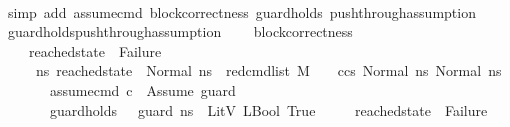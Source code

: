 \begin{isabellebody}
%
\isadelimproof
\ \ \ \ %
\endisadelimproof
%
\isatagproof
{}\isamarkupfalse%
\ {\isacharparenleft}{\kern0pt}simp\ add{\isacharcolon}{\kern0pt}\ assume{\isacharunderscore}{\kern0pt}cmd\ block{\isacharunderscore}{\kern0pt}correctness\ guard{\isacharunderscore}{\kern0pt}holds\ push{\isacharunderscore}{\kern0pt}through{\isacharunderscore}{\kern0pt}assumption{}{\isacharparenright}{\kern0pt}%
\endisatagproof
{\isafoldproof}%
%
\isadelimproof
\isanewline
%
\endisadelimproof
\isanewline
{}\isamarkupfalse%
\ guard{\isacharunderscore}{\kern0pt}holds{\isacharunderscore}{\kern0pt}push{\isacharunderscore}{\kern0pt}through{\isacharunderscore}{\kern0pt}assumption{}{\isacharcolon}{\kern0pt}\ \isanewline
\ \ \ block{\isacharunderscore}{\kern0pt}correctness{\isacharcolon}{\kern0pt}\ \isanewline
\ \ \ \ {\isachardoublequoteopen}reached{\isacharunderscore}{\kern0pt}state\ {\isasymnoteq}\ Failure\ {\isasymand}\ \isanewline
\ \ \ \ {\isacharparenleft}{\kern0pt}{\isasymforall}\ ns{}{\isacharprime}{\kern0pt}{\isachardot}{\kern0pt}\ reached{\isacharunderscore}{\kern0pt}state\ {\isacharequal}{\kern0pt}\ Normal\ ns{}{\isacharprime}{\kern0pt}\ {\isasymlongrightarrow}\ {\isacharparenleft}{\kern0pt}red{\isacharunderscore}{\kern0pt}cmd{\isacharunderscore}{\kern0pt}list\ M\ {\isasymLambda}\ {\isasymGamma}\ {\isasymOmega}\ {\isacharparenleft}{\kern0pt}c{\isacharhash}{\kern0pt}cs{}{\isacharparenright}{\kern0pt}\ {\isacharparenleft}{\kern0pt}Normal\ ns{}{\isacharparenright}{\kern0pt}\ {\isacharparenleft}{\kern0pt}Normal\ ns{}{\isacharprime}{\kern0pt}{\isacharparenright}{\kern0pt}{\isacharparenright}{\kern0pt}{\isacharparenright}{\kern0pt}{\isachardoublequoteclose}\isanewline
\ \ \ \ \ \ \ assume{\isacharunderscore}{\kern0pt}cmd{\isacharcolon}{\kern0pt}\ {\isachardoublequoteopen}c\ {\isacharequal}{\kern0pt}\ Assume\ guard{\isachardoublequoteclose}\isanewline
\ \ \ \ \ \ \ guard{\isacharunderscore}{\kern0pt}holds{\isacharcolon}{\kern0pt}\ {\isachardoublequoteopen}{\isasymLambda}{\isacharcomma}{\kern0pt}{\isasymGamma}{\isacharcomma}{\kern0pt}{\isasymOmega}\ {\isasymturnstile}\ {\isasymlangle}guard{\isacharcomma}{\kern0pt}\ ns{}{\isasymrangle}\ {\isasymDown}\ LitV\ {\isacharparenleft}{\kern0pt}LBool\ True{\isacharparenright}{\kern0pt}{\isachardoublequoteclose}\isanewline
\ \ \ \ \ {\isachardoublequoteopen}reached{\isacharunderscore}{\kern0pt}state\ {\isasymnoteq}\ Failure\ {\isasymand}\ \isanewline

\end{isabellebody}

